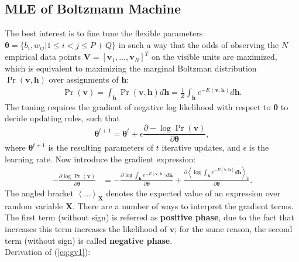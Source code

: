 \documentclass[11pt]{article}
\newcommand{\mean}[2]{\left\langle{#1}\right\rangle_{#2}}
\newcommand{\vh}{\boldsymbol{h}}
\newcommand{\vv}{\boldsymbol{v}}
\newcommand{\mv}{\boldsymbol{V}}
\newcommand{\mx}{\boldsymbol{X}}
\newcommand{\vvt}{\tilde{\vv}}
\newcommand{\pEC}{\boldsymbol{\theta}}
\newcommand{\PDV}[2]{\frac{\partial #1}{\partial #2}}
\begin{document}
\subsection{MLE of Boltzmann Machine}
The best interest is to fine tune the flexible parameters $\pEC=\{b_i, w_{ij} | 1 \le i < j \le P+Q \}$ in such a way that the odds of observing the $N$ empirical data points $\mv=[\vv_1, \dots, \vv_N]^T$ on the visible units are maximized, which is equivalent to maximizing the marginal Boltzman distribution $\Pr(\vv, \vh)$ over assignments of $\vh$:
\begin{equation} \label{eq:p(v)}  %
  \begin{split}
    \Pr(\vv) = \int_{\vh}{\Pr(\vv, \vh)d\vh} = \frac{1}{Z} \int_{\vh}{e^{-E(\vv, \vh)}d\vh}.
  \end{split}
\end{equation}
The tuning requires the gradient of negative log likelihood with respect to $\pEC$ to decide updating rules, such that
\[ \pEC^{t+1} = \pEC^t + \epsilon \PDV{-\log{\Pr(\vv)}}{\pEC}, \]
where $\pEC^{t+1}$ is the resulting parameters of $t$ iterative updates, and $\epsilon$ is the learning rate. Now introduce the gradient expression:
\begin{align}\label{eq:gv1}
  -\PDV{\log{\Pr(\vv)}}{\pEC} &= -\PDV{\log{\int_{\vh}{e^{-E(\vv, \vh)}d\vh}}}{\pEC} + \PDV{\mean{\log{\int_{\vh}{e^{-E(\vvt, \vh)}d\vh}}}{\vvt}}{\pEC}.
\end{align}
The angled bracket $\mean{\dots}{\mx}$ denotes the expected value of an expression over random variable $\mx$.
There are a number of ways to interpret the gradient terms. The first term (without sign) is referred as \textbf{positive phase}, due to the fact that increases this term increases the likelihood of $\vv$; for the same reason, the second term (without sign) is called \textbf{negative phase}.\\
Derivation of (\ref{eq:gv1}):
\end{document}
